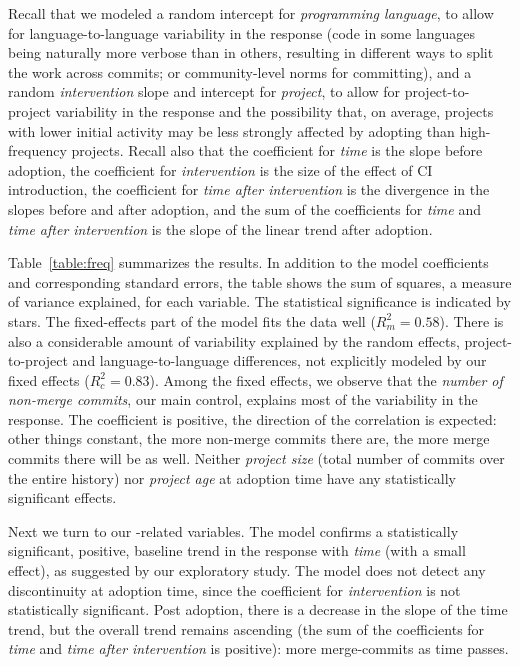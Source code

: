 
%

Recall that we modeled a random intercept for \emph{programming language}, 
to allow for language-to-language variability in the response (\ie code in some 
languages being naturally more verbose than in others, resulting in different
ways to split the work across commits; or community-level norms for committing), 
and a random \emph{intervention} slope and intercept for \emph{project}, to allow 
for project-to-project variability in the response and the possibility that, on average, 
projects with lower initial activity may be less strongly affected by adopting 
\Tvis than high-frequency projects.
Recall also that the coefficient for \emph{time} is the slope before adoption,
the coefficient for \emph{intervention} is the size of the effect of CI introduction,
the coefficient for \emph{time after intervention} is the divergence in the slopes
before and after \Tvis adoption, and the sum of the coefficients for \emph{time}
and \emph{time after intervention} is the slope of the linear trend after \Tvis
adoption.

Table~\ref{table:freq} summarizes the results.
In addition to the model coefficients and corresponding standard errors, the table 
shows the sum of squares, a measure of variance explained, for each variable.
The statistical significance is indicated by stars.
The fixed-effects part of the model fits the data well ($R_m^2=0.58$).
There is also a considerable amount of variability explained by the random
effects, \ie project-to-project and language-to-language differences, not 
explicitly modeled by our fixed effects ($R_c^2=0.83$).
Among the fixed effects, we observe that the \emph{number of non-merge 
commits}, our main control, explains most of the variability in the response.
The coefficient is positive, \ie the direction of the correlation is expected: 
other things constant, the more non-merge commits there are, the more 
merge commits there will be as well.
Neither \emph{project size} (total number of commits over the entire history) nor 
\emph{project age} at adoption time have any statistically significant effects.

Next we turn to our \Tvi-related variables.
The model confirms a statistically significant, positive, baseline trend in the response 
with \emph{time} (with a small effect), as suggested by our exploratory study.
The model does not detect any discontinuity at adoption time, since the coefficient 
for \emph{intervention} is not statistically significant.
Post adoption, there is a decrease in the slope of the time trend, but the overall 
trend remains ascending (the sum of the coefficients for \emph{time} and 
\emph{time after intervention} is positive): more merge-commits as time passes.

